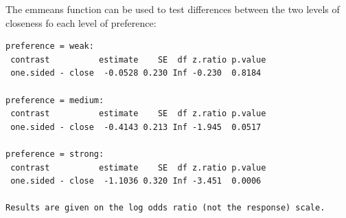 \documentclass[
]{article}
\newenvironment{Shaded}{\begin{snugshade}}{\end{snugshade}}
\newcommand{\KeywordTok}[1]{\textcolor[rgb]{0.13,0.29,0.53}{\textbf{#1}}}
\newcommand{\NormalTok}[1]{#1}
\newcommand{\OperatorTok}[1]{\textcolor[rgb]{0.81,0.36,0.00}{\textbf{#1}}}
\newcommand{\StringTok}[1]{\textcolor[rgb]{0.31,0.60,0.02}{#1}}
\begin{document}
The emmeans function can be used to test differences between the two
levels of closeness fo each level of preference:

\begin{Shaded}
\end{Shaded}

\begin{verbatim}
preference = weak:
 contrast          estimate    SE  df z.ratio p.value
 one.sided - close  -0.0528 0.230 Inf -0.230  0.8184 

preference = medium:
 contrast          estimate    SE  df z.ratio p.value
 one.sided - close  -0.4143 0.213 Inf -1.945  0.0517 

preference = strong:
 contrast          estimate    SE  df z.ratio p.value
 one.sided - close  -1.1036 0.320 Inf -3.451  0.0006 

Results are given on the log odds ratio (not the response) scale. 
\end{verbatim}
\end{document}
